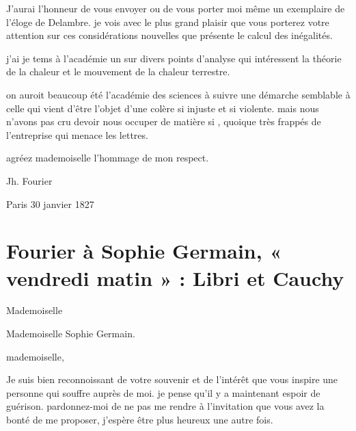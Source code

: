 \documentclass[11pt,a4paper]{article}
\begin{document}

J'aurai l'honneur de vous envoyer ou de vous porter moi même un exemplaire de
l'éloge de Delambre. je vois avec le plus grand plaisir que vous porterez
votre attention sur ces considérations nouvelles que présente le calcul des
inégalités.


j'ai \ill{} je  tems à l'académie un \ill{} sur divers points
d'analyse qui intéressent la théorie de la chaleur et le mouvement
 de la chaleur terrestre.


on auroit beaucoup \ill{} été \ill{} l'académie des sciences à suivre une
démarche semblable à celle qui vient d'être l'objet d'une colère si injuste
et si violente. mais nous n'avons pas cru devoir nous occuper de \ill{}
matière si , quoique très frappés de l'entreprise qui
menace les lettres.


agréez mademoiselle l'hommage de mon respect.

Jh. Fourier

Paris 30 janvier 1827

\section{Fourier à Sophie Germain, « vendredi matin » : Libri et Cauchy}

Mademoiselle

Mademoiselle Sophie Germain.


mademoiselle,

Je suis bien reconnoissant de votre souvenir et de l'intérêt que vous inspire
une personne qui souffre auprès de moi. je pense qu'il y a maintenant espoir
de guérison. pardonnez-moi de ne pas me rendre à l'invitation que vous avez
la bonté de me proposer, j'espère être plus heureux une autre fois.
\end{document}
